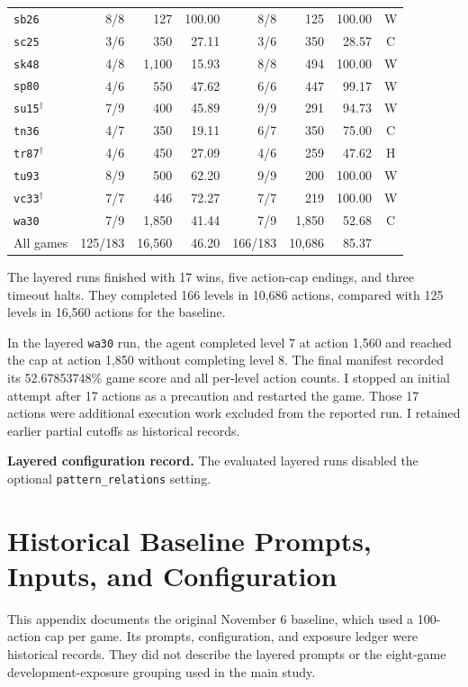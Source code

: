 \begin{longtable}{@{}lrrr rrr c@{}}
\texttt{sb26} & 8/8 & 127 & 100.00 & 8/8 & 125 & 100.00 & W\\
\texttt{sc25} & 3/6 & 350 & 27.11 & 3/6 & 350 & 28.57 & C\\
\texttt{sk48} & 4/8 & 1,100 & 15.93 & 8/8 & 494 & 100.00 & W\\
\texttt{sp80} & 4/6 & 550 & 47.62 & 6/6 & 447 & 99.17 & W\\
\texttt{su15}$^{\dagger}$ & 7/9 & 400 & 45.89 & 9/9 & 291 & 94.73 & W\\
\texttt{tn36} & 4/7 & 350 & 19.11 & 6/7 & 350 & 75.00 & C\\
\texttt{tr87}$^{\dagger}$ & 4/6 & 450 & 27.09 & 4/6 & 259 & 47.62 & H\\
\texttt{tu93} & 8/9 & 500 & 62.20 & 9/9 & 200 & 100.00 & W\\
\texttt{vc33}$^{\dagger}$ & 7/7 & 446 & 72.27 & 7/7 & 219 & 100.00 & W\\
\texttt{wa30} & 7/9 & 1,850 & 41.44 & 7/9 & 1,850 & 52.68 & C\\
\midrule
All games & 125/183 & 16,560 & 46.20 & 166/183 & 10,686 & 85.37 & \\
\bottomrule
\end{longtable}

The layered runs finished with 17 wins, five action-cap endings, and three timeout halts. They completed 166 levels in 10,686 actions, compared with 125 levels in 16,560 actions for the baseline.

In the layered \texttt{wa30} run, the agent completed level 7 at action 1,560 and reached the cap at action 1,850 without completing level 8. The final manifest recorded its 52.67853748\% game score and all per-level action counts. I stopped an initial attempt after 17 actions as a precaution and restarted the game. Those 17 actions were additional execution work excluded from the reported run. I retained earlier partial cutoffs as historical records.

\textbf{Layered configuration record.} The evaluated layered runs disabled the optional \texttt{pattern\_relations} setting.

\section{Historical Baseline Prompts, Inputs, and Configuration}\label{app:prompts}
This appendix documents the original November 6 baseline, which used a 100-action cap per game. Its prompts, configuration, and exposure ledger were historical records. They did not describe the layered prompts or the eight-game development-exposure grouping used in the main study.

